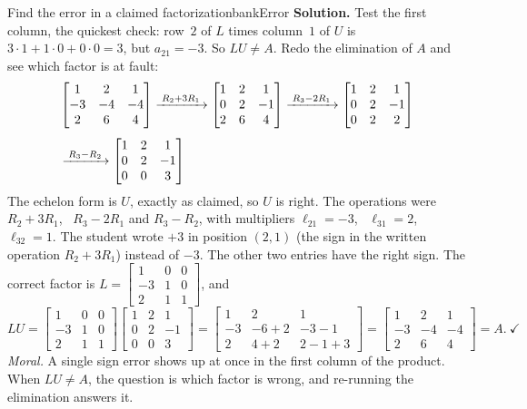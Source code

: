 \documentclass[11pt]{article}
\begin{document}
\begin{exmp}{Find the error in a claimed factorization}{bankError}
\textbf{Solution.} Test the first column, the quickest check: row~$2$ of $L$ times column~$1$ of $U$ is $3\cdot1+1\cdot0+0\cdot0=3$, but $a_{21}=-3$. So $LU\neq A$. Redo the elimination of $A$ and see which factor is at fault:
\begin{align*}
&\begin{bmatrix}1&2&1\\-3&-4&-4\\2&6&4\end{bmatrix}
\xrightarrow{\;R_2+3R_1\;}
\begin{bmatrix}1&2&1\\0&2&-1\\2&6&4\end{bmatrix}
\xrightarrow{\;R_3-2R_1\;}
\begin{bmatrix}1&2&1\\0&2&-1\\0&2&2\end{bmatrix}\\[4pt]
&\xrightarrow{\;R_3-R_2\;}
\begin{bmatrix}1&2&1\\0&2&-1\\0&0&3\end{bmatrix}
\end{align*}
The echelon form is $U$, exactly as claimed, so $U$ is right. The operations were $R_2+3R_1$, \ $R_3-2R_1$ and $R_3-R_2$, with multipliers $\ell_{21}=-3$, \ $\ell_{31}=2$, \ $\ell_{32}=1$. The student wrote $+3$ in position $(2,1)$ (the sign in the written operation $R_2+3R_1$) instead of $-3$. The other two entries have the right sign. The correct factor is $L=\begin{bmatrix}1&0&0\\-3&1&0\\2&1&1\end{bmatrix}$, and
\[
LU=\begin{bmatrix}1&0&0\\-3&1&0\\2&1&1\end{bmatrix}\begin{bmatrix}1&2&1\\0&2&-1\\0&0&3\end{bmatrix}=\begin{bmatrix}1&2&1\\-3&-6+2&-3-1\\2&4+2&2-1+3\end{bmatrix}=\begin{bmatrix}1&2&1\\-3&-4&-4\\2&6&4\end{bmatrix}=A.\ \checkmark
\]
\emph{Moral.} A single sign error shows up at once in the first column of the product. When $LU\neq A$, the question is which factor is wrong, and re-running the elimination answers it.
\end{exmp}
\end{document}
